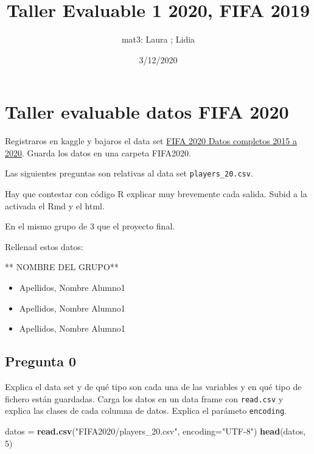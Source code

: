 \documentclass[
]{article}
\title{Taller Evaluable 1 2020, FIFA 2019}
\author{mat3: Laura ; Lidia}
\date{3/12/2020}
\newenvironment{Shaded}{\begin{snugshade}}{\end{snugshade}}
\newcommand{\DataTypeTok}[1]{\textcolor[rgb]{0.13,0.29,0.53}{#1}}
\newcommand{\DecValTok}[1]{\textcolor[rgb]{0.00,0.00,0.81}{#1}}
\newcommand{\KeywordTok}[1]{\textcolor[rgb]{0.13,0.29,0.53}{\textbf{#1}}}
\newcommand{\NormalTok}[1]{#1}
\newcommand{\StringTok}[1]{\textcolor[rgb]{0.31,0.60,0.02}{#1}}
\providecommand{\tightlist}{%
  \setlength{\itemsep}{0pt}\setlength{\parskip}{0pt}}
\begin{document}
\maketitle

\hypertarget{taller-evaluable-datos-fifa-2020}{%
\section{Taller evaluable datos FIFA
2020}\label{taller-evaluable-datos-fifa-2020}}

Registraros en kaggle y bajaros el data set
\href{https://www.kaggle.com/stefanoleone992/fifa-20-complete-player-dataset}{FIFA
2020 Datos completos 2015 a 2020}. Guarda los datos en una carpeta
FIFA2020.

Las siguientes preguntas son relativas al data set
\texttt{players\_20.csv}.

Hay que contestar con código R explicar muy brevemente cada salida.
Subid a la activada el Rmd y el html.

En el mismo grupo de 3 que el proyecto final.

Rellenad estos datos:

** NOMBRE DEL GRUPO**

\begin{itemize}
\tightlist
\item
  Apellidos, Nombre Alumno1
\item
  Apellidos, Nombre Alumno1
\item
  Apellidos, Nombre Alumno1
\end{itemize}

\hypertarget{pregunta-0}{%
\subsection{Pregunta 0}\label{pregunta-0}}

Explica el data set y de qué tipo son cada una de las variables y en qué
tipo de fichero están guardadas. Carga los datos en un data frame con
\texttt{read.csv} y explica las clases de cada columna de datos. Explica
el parámeto \texttt{encoding}.

\begin{Shaded}
\begin{Highlighting}[]
\NormalTok{datos =}\StringTok{ }\KeywordTok{read.csv}\NormalTok{(}\StringTok{"FIFA2020/players_20.csv"}\NormalTok{, }\DataTypeTok{encoding=}\StringTok{"UTF-8"}\NormalTok{)}
\KeywordTok{head}\NormalTok{(datos, }\DecValTok{5}\NormalTok{)}
\end{Highlighting}
\end{Shaded}
\end{document}
